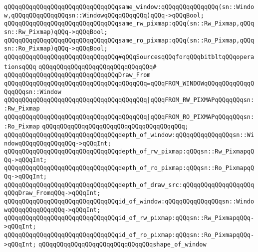 \newline
\verb|qQQqqQQqqQQqqQQqqQQqqQQqqQQqqQQqsame_window:qQQqqQQqqQQqqQQq(sn::Window,qQQqqQQqqQQqqQQqsn::WindowqQQqqQQqqQQq)qQQq->qQQqBool;|\newline
\verb|qQQqqQQqqQQqqQQqqQQqqQQqqQQqqQQqsame_rw_pixmap:qQQq(sn::Rw_Pixmap,qQQqsn::Rw_Pixmap)qQQq->qQQqBool;|\newline
\verb|qQQqqQQqqQQqqQQqqQQqqQQqqQQqqQQqsame_ro_pixmap:qQQq(sn::Ro_Pixmap,qQQqsn::Ro_Pixmap)qQQq->qQQqBool;|\newline
\newline
\verb|qQQqqQQqqQQqqQQqqQQqqQQqqQQqqQQq#qQQqSourcesqQQqforqQQqbitbltqQQqoperationsqQQq|\newline
\verb|qQQqqQQqqQQqqQQqqQQqqQQqqQQqqQQq#|\newline
\verb|qQQqqQQqqQQqqQQqqQQqqQQqqQQqqQQqDraw_From|\newline
\verb|qQQqqQQqqQQqqQQqqQQqqQQqqQQqqQQqqQQqqQQq=qQQqFROM_WINDOWqQQqqQQqqQQqqQQqqQQqsn::Window|\newline
\verb|qQQqqQQqqQQqqQQqqQQqqQQqqQQqqQQqqQQqqQQq|\verb#|qQQqFROM_RW_PIXMAPqQQqqQQqsn::Rw_Pixmap#\newline
\verb|qQQqqQQqqQQqqQQqqQQqqQQqqQQqqQQqqQQqqQQq|\verb#|qQQqFROM_RO_PIXMAPqQQqqQQqsn::Ro_Pixmap#\newline
\verb|qQQqqQQqqQQqqQQqqQQqqQQqqQQqqQQqqQQqqQQq;|\newline
\newline
\verb|qQQqqQQqqQQqqQQqqQQqqQQqqQQqqQQqdepth_of_window:qQQqqQQqqQQqqQQqsn::WindowqQQqqQQqqQQqqQQq->qQQqInt;|\newline
\verb|qQQqqQQqqQQqqQQqqQQqqQQqqQQqqQQqdepth_of_rw_pixmap:qQQqsn::Rw_PixmapqQQq->qQQqInt;|\newline
\verb|qQQqqQQqqQQqqQQqqQQqqQQqqQQqqQQqdepth_of_ro_pixmap:qQQqsn::Ro_PixmapqQQq->qQQqInt;|\newline
\verb|qQQqqQQqqQQqqQQqqQQqqQQqqQQqqQQqdepth_of_draw_src:qQQqqQQqqQQqqQQqqQQqqQQqDraw_FromqQQq->qQQqInt;|\newline
\newline
\verb|qQQqqQQqqQQqqQQqqQQqqQQqqQQqqQQqid_of_window:qQQqqQQqqQQqqQQqsn::WindowqQQqqQQqqQQqqQQq->qQQqInt;|\newline
\verb|qQQqqQQqqQQqqQQqqQQqqQQqqQQqqQQqid_of_rw_pixmap:qQQqsn::Rw_PixmapqQQq->qQQqInt;|\newline
\verb|qQQqqQQqqQQqqQQqqQQqqQQqqQQqqQQqid_of_ro_pixmap:qQQqsn::Ro_PixmapqQQq->qQQqInt;|\newline
\newline
\verb|qQQqqQQqqQQqqQQqqQQqqQQqqQQqqQQqshape_of_window|\newline
